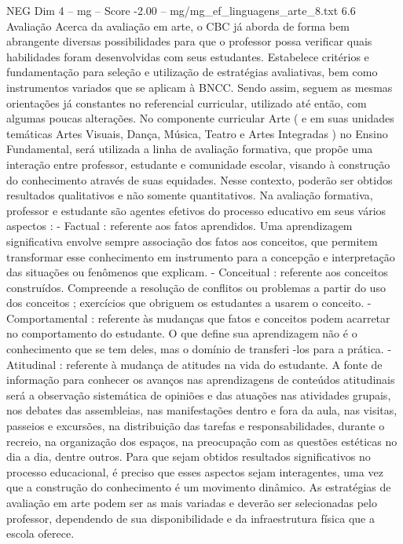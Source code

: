 \begin{textsample}{NEG Dim 4 – mg – Score -2.00 – mg/mg\_ef\_linguagens\_arte\_8.txt}  \label{ex:f4_neg_095}
6.6 Avaliação Acerca da avaliação em arte, o CBC já aborda de forma bem abrangente diversas possibilidades para que o professor possa verificar quais habilidades foram desenvolvidas com seus estudantes.
Estabelece critérios e fundamentação para seleção e utilização de estratégias avaliativas, bem como instrumentos variados que se aplicam à BNCC.
Sendo assim, seguem as mesmas orientações já constantes no referencial curricular, utilizado até então, com algumas poucas alterações.
No componente curricular Arte ( e em suas unidades temáticas Artes Visuais, Dança, Música, Teatro e Artes Integradas ) no Ensino Fundamental, será utilizada a linha de avaliação formativa, que propõe uma interação entre professor, estudante e comunidade escolar, visando à construção do conhecimento através de suas equidades.
Nesse contexto, poderão ser obtidos resultados qualitativos e não somente quantitativos.
Na avaliação formativa, professor e estudante são agentes efetivos do processo educativo em seus vários aspectos : - Factual : referente aos fatos aprendidos.
Uma aprendizagem significativa envolve sempre associação dos fatos aos conceitos, que permitem transformar esse conhecimento em instrumento para a concepção e interpretação das situações ou fenômenos que explicam. - Conceitual : referente aos conceitos construídos.
Compreende a resolução de conflitos ou problemas a partir do uso dos conceitos ; exercícios que obriguem os estudantes a usarem o conceito. - Comportamental : referente às mudanças que fatos e conceitos podem acarretar no comportamento do estudante.
O que define sua aprendizagem não é o conhecimento que se tem deles, mas o domínio de transferi -los para a prática. - Atitudinal : referente à mudança de atitudes na vida do estudante.
A fonte de informação para conhecer os avanços nas aprendizagens de conteúdos atitudinais será a observação sistemática de opiniões e das atuações nas atividades grupais, nos debates das assembleias, nas manifestações dentro e fora da aula, nas visitas, passeios e excursões, na distribuição das tarefas e responsabilidades, durante o recreio, na organização dos espaços, na preocupação com as questões estéticas no dia a dia, dentre outros.
Para que sejam obtidos resultados significativos no processo educacional, é preciso que esses aspectos sejam interagentes, uma vez que a construção do conhecimento é um movimento dinâmico.
As estratégias de avaliação em arte podem ser as mais variadas e deverão ser selecionadas pelo professor, dependendo de sua disponibilidade e da infraestrutura física que a escola oferece.

\end{textsample}
